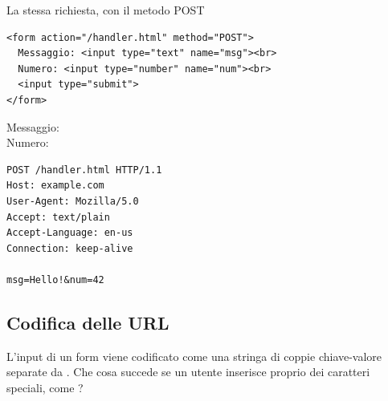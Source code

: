 \begin{esempio}{La stessa richiesta, con il metodo POST}
\begin{affianco}[0.53]
\begin{lstlisting}[style=html, name=form-post.html]
<form action="/handler.html" method="POST">
  Messaggio: <input type="text" name="msg"><br>
  Numero: <input type="number" name="num"><br>
  <input type="submit">
</form>
\end{lstlisting}
\begin{browser}
  Messaggio: \\[3pt]
  Numero: \\[5pt]
\end{browser}
\risultato
\begin{lstlisting}[style=http, name=Richiesta generata]
POST /handler.html HTTP/1.1
Host: example.com
User-Agent: Mozilla/5.0
Accept: text/plain
Accept-Language: en-us
Connection: keep-alive

msg=Hello!&num=42
\end{lstlisting}
\end{affianco}
\end{esempio}


\subsection{Codifica delle URL}

L'input di un form viene codificato come una stringa di coppie chiave-valore
separate da \code{\&}. Che cosa succede se un utente inserisce proprio dei
caratteri speciali, come \code{\&}?

